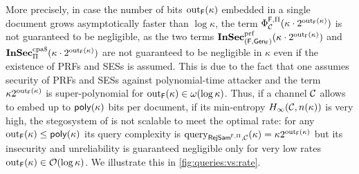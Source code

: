 More precisely, in case the number of bits $\operatorname{out}_{\operatorname{\mathsf{F}}}(\kappa)$
embedded in a single document grows asymptotically faster than
$\log \kappa$, the term $\Phi_{\mathcal{C}}^{\operatorname{\mathsf{F}},\Pi}(\kappa\cdot
2^{\operatorname{out}_{\operatorname{\mathsf{F}}}(\kappa)})$ is not guaranteed to be negligible, as the
two terms
$\operatorname{\mathbf{InSec}}^{\operatorname{prf}}_{(\operatorname{\mathsf{F}},\operatorname{\mathsf{Gen}}_{\operatorname{\mathsf{F}}})}(\kappa\cdot
2^{\operatorname{out}_{\operatorname{\mathsf{F}}}(\kappa)})$ and $\InSec^{\cpad}_{\Pi}(\kappa\cdot
2^{\fout_{\algf}(\kappa)})$ are not
guaranteed to be negligible in $\kappa$ even if the existence of
\acp{PRF} and \acp{SES} is assumed. This is due to the fact that one
assumes security of \acp{PRF} and \acp{SES} against polynomial-time
attacker and the term $\kappa 2^{\operatorname{out}_{\operatorname{\mathsf{F}}}(\kappa)}$ is super-polynomial for
$\operatorname{out}_{\operatorname{\mathsf{F}}}(\kappa) \in \omega(\log \kappa)$.
Thus, if a channel $\mathcal{C}$ allows to embed up to 
$\operatorname{\mathsf{poly}}(\kappa)$ bits per document, \ie if its min-entropy $H_{\infty}(\mathcal{C},n(\kappa))$ is very high, 
the stegosystem of \citeauthor{hopper2009provably} is not scalable to
meet the optimal rate:
for any $\operatorname{out}_{\operatorname{\mathsf{F}}}(\kappa)\le \operatorname{\mathsf{poly}}(\kappa)$ its query complexity is  
$\operatorname{query}_{\operatorname{\mathsf{RejSam}}^{\operatorname{\mathsf{F}},\Pi},\mathcal{C}}(\kappa)=\kappa 2^{\operatorname{out}_{\operatorname{\mathsf{F}}}(\kappa)}$  but its 
insecurity and unreliability is guaranteed negligible only for very low
rates 
$\operatorname{out}_{\operatorname{\mathsf{F}}}(\kappa) \in  \mathcal{O}(\log \kappa)$.
We illustrate this in \autoref{fig:queries:vs:rate}.


